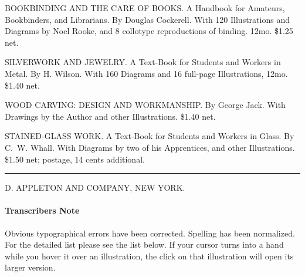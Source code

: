 \documentclass[
]{article}
\begin{document}
BOOKBINDING AND THE CARE OF BOOKS. A Handbook for Amateurs, Bookbinders,
and Librarians. By {Douglas Cockerell}. With 120 Illustrations and
Diagrams by Noel Rooke, and 8 collotype reproductions of binding. 12mo.
\$1.25 net.

SILVERWORK AND JEWELRY. A Text-Book for Students and Workers in Metal.
By {H. Wilson}. With 160 Diagrams and 16 full-page Illustrations, 12mo.
\$1.40 net.

WOOD CARVING: DESIGN AND WORKMANSHIP. By {George Jack}. With Drawings by
the Author and other Illustrations. \$1.40 net.

STAINED-GLASS WORK. A Text-Book for Students and Workers in Glass. By
{C.~W. Whall}. With Diagrams by two of his Apprentices, and other
Illustrations. \$1.50 net; postage, 14 cents additional.

\begin{center}\rule{0.5\linewidth}{0.5pt}\end{center}

D. APPLETON AND COMPANY, NEW YORK.

\hypertarget{transcribers-note}{%
\paragraph{Transcriber\textquotesingle s Note}\label{transcribers-note}}

Obvious typographical errors have been corrected. Spelling has been
normalized. For the detailed list please see the list below. If your
cursor turns into a hand while you hover it over an illustration, the
click on that illustration will open its larger version.
\end{document}
